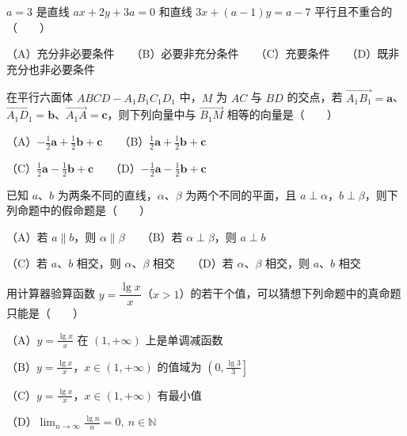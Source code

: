 \begin{question}
$a=3$ 是直线 $ax+2y+3a=0$ 和直线 $3x+(a-1)y=a-7$ 平行且不重合的\mbox{（　　）}

（A）充分非必要条件　　（B）必要非充分条件　　（C）充要条件　　（D）既非充分也非必要条件

\end{question}
\begin{question}
在平行六面体 $ABCD-A_1B_1C_1D_1$ 中，$M$ 为 $AC$ 与 $BD$ 的交点，若 $\overrightarrow{A_1B_1}=\boldsymbol a$、$\overrightarrow{A_1D_1}=\boldsymbol b$、$\overrightarrow{A_1A}=\boldsymbol c$，则下列向量中与 $\overrightarrow{B_1M}$ 相等的向量是\mbox{（　　）}

（A）$-\frac12\boldsymbol a+\frac12\boldsymbol b+\boldsymbol c$　　（B）$\frac12\boldsymbol a+\frac12\boldsymbol b+\boldsymbol c$

（C）$\frac12\boldsymbol a-\frac12\boldsymbol b+\boldsymbol c$　　（D）$-\frac12\boldsymbol a-\frac12\boldsymbol b+\boldsymbol c$

\end{question}
\begin{question}
已知 $a$、$b$ 为两条不同的直线，$\alpha$、$\beta$ 为两个不同的平面，且 $a\perp\alpha$，$b\perp\beta$，则下列命题中的假命题是\mbox{（　　）}

（A）若 $a\parallel b$，则 $\alpha\parallel\beta$　　（B）若 $\alpha\perp\beta$，则 $a\perp b$

（C）若 $a$、$b$ 相交，则 $\alpha$、$\beta$ 相交　　（D）若 $\alpha$、$\beta$ 相交，则 $a$、$b$ 相交

\end{question}
\begin{question}
用计算器验算函数 $y=\dfrac{\lg x}{x}$（$x>1$）的若干个值，可以猜想下列命题中的真命题只能是\mbox{（　　）}

（A）$y=\frac{\lg x}{x}$ 在 $(1,+\infty)$ 上是单调减函数

（B）$y=\frac{\lg x}{x}$，$x\in(1,+\infty)$ 的值域为 $\left(0,\frac{\lg3}{3}\right]$

（C）$y=\frac{\lg x}{x}$，$x\in(1,+\infty)$ 有最小值

（D）$\displaystyle\lim_{n\to\infty}\frac{\lg n}{n}=0,\ n\in\mathbb N$

\end{question}

